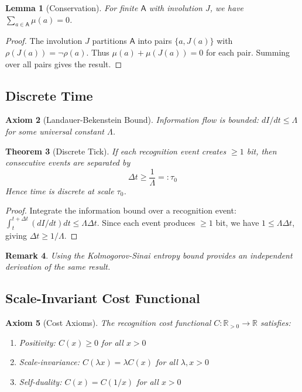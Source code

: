 \documentclass[12pt,a4paper]{article}
\newtheorem{theorem}{Theorem}
\newtheorem{lemma}[theorem]{Lemma}
\newtheorem{axiom}[theorem]{Axiom}
\newtheorem{remark}[theorem]{Remark}
\newcommand{\R}{\mathbb{R}}
\begin{document}
\begin{lemma}[Conservation]\label{lem:conservation}
For finite $\mathsf{A}$ with involution $J$, we have $\sum_{a \in \mathsf{A}} \mu(a) = 0$.
\end{lemma}

\begin{proof}
The involution $J$ partitions $\mathsf{A}$ into pairs $\{a, J(a)\}$ with $\rho(J(a)) = \neg \rho(a)$. Thus $\mu(a) + \mu(J(a)) = 0$ for each pair. Summing over all pairs gives the result.
\end{proof}

\subsection{Discrete Time}

\begin{axiom}[Landauer-Bekenstein Bound]
Information flow is bounded: $dI/dt \leq \Lambda$ for some universal constant $\Lambda$.
\end{axiom}

\begin{theorem}[Discrete Tick]\label{thm:discrete}
If each recognition event creates $\geq 1$ bit, then consecutive events are separated by
\[
\Delta t \geq \frac{1}{\Lambda} =: \tau_0
\]
Hence time is discrete at scale $\tau_0$.
\end{theorem}

\begin{proof}
Integrate the information bound over a recognition event: $\int_t^{t+\Delta t} (dI/dt) dt \leq \Lambda \Delta t$. Since each event produces $\geq 1$ bit, we have $1 \leq \Lambda \Delta t$, giving $\Delta t \geq 1/\Lambda$.
\end{proof}

\begin{remark}
Using the Kolmogorov-Sinai entropy bound \cite{brudno1978} provides an independent derivation of the same result.
\end{remark}

\subsection{Scale-Invariant Cost Functional}

\begin{axiom}[Cost Axioms]
The recognition cost functional $C : \R_{>0} \to \R$ satisfies:
\begin{enumerate}
\item Positivity: $C(x) \geq 0$ for all $x > 0$
\item Scale-invariance: $C(\lambda x) = \lambda C(x)$ for all $\lambda, x > 0$
\item Self-duality: $C(x) = C(1/x)$ for all $x > 0$
\end{enumerate}
\end{axiom}
\end{document}
